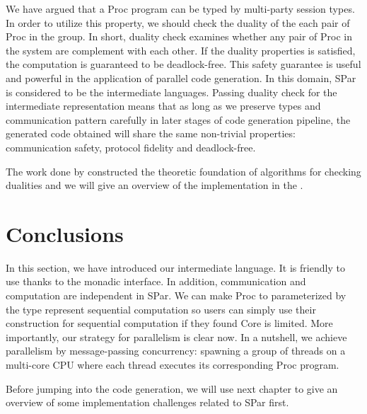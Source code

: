 We have argued that a Proc program can be typed by multi-party session types. In order to utilize this property, we should check the duality of the each pair of Proc in the group. In short, duality check examines whether any pair of Proc in the system are complement with each other. If the duality properties is satisfied, the computation is guaranteed to be deadlock-free. This safety guarantee is useful and powerful in the application of parallel code generation. In this domain, SPar is considered to be the intermediate languages. Passing duality check for the intermediate representation means that as long as we preserve types and communication pattern carefully in later stages of code generation pipeline, the generated code obtained will share the same non-trivial properties: communication safety, protocol fidelity and deadlock-free.

The work done by \cite{coppoGentleIntroductionMultiparty2015} constructed the theoretic foundation of algorithms for checking dualities and we will give an overview of the implementation in the .

\section{Conclusions}
In this section, we have introduced our intermediate language. It is friendly to use thanks to the monadic interface. In addition, communication and computation are independent in SPar. We can make Proc to parameterized by the type represent sequential computation so users can simply use their construction for sequential computation if they found Core is limited. More importantly, our strategy for parallelism is clear now. In a nutshell, we achieve parallelism by message-passing concurrency: spawning a group of threads on a multi-core CPU where each thread executes its corresponding Proc program.

Before jumping into the code generation, we will use next chapter to give an overview of some implementation challenges related to SPar first.